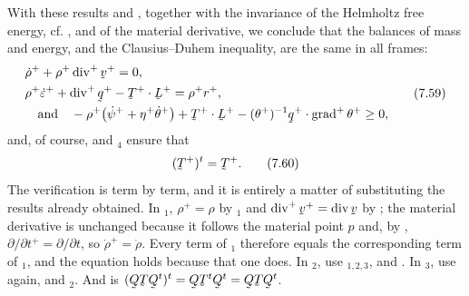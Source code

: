 With these results and , together with the invariance of the
Helmholtz free energy, cf. , and of the material derivative,
we conclude that the balances of mass and energy, and the
Clausius--Duhem inequality, are the same in all frames:
\begin{equation}
\begin{aligned}
   &\dot\rho^{+}+\rho^{+}\dvg^{+}\bv^{+}=0,\\
   &\rho^{+}\dot\eps^{+}+\dvg^{+}\bq^{+}-\bT^{+}\cdot\bL^{+}
     =\rho^{+}r^{+},\\
   &\quad\text{and}\quad
   -\rho^{+}\big(\dot\psi^{+}+\eta^{+}\dot\theta^{+}\big)
   +\bT^{+}\cdot\bL^{+}
   -(\theta^{+})^{-1}\ip{\bq^{+}}{\grad^{+}\theta^{+}}\geq0 ,
\end{aligned}
   \tag{7.59}\label{eq:7.59}
\end{equation}
and, of course,  and $_{4}$ ensure that
\begin{equation}
   (\bT^{+})^{t}=\bT^{+}.
   \tag{7.60}\label{eq:7.60}
\end{equation}
The verification is term by term, and it is entirely a matter of
substituting the results already obtained. In $_{1}$,
$\rho^{+}=\rho$ by $_{1}$ and $\dvg^{+}\bv^{+}=\dvg\bv$ by
; the material derivative is unchanged because it follows the
material point $p$ and, by , $\partial/\partial t^{+}
=\partial/\partial t$, so $\dot\rho^{+}=\dot\rho$. Every term of
$_{1}$ therefore equals the corresponding term of
$_{1}$, and the equation holds because that one does. In
$_{2}$, use $_{1,2,3}$,  and . In
$_{3}$, use  again,  and $_{2}$.
And  is $(\bQ\bT\bQ^{t})^{t}=\bQ\bT^{t}\bQ^{t}
=\bQ\bT\bQ^{t}$.

